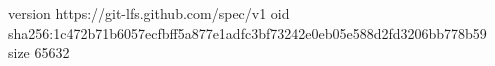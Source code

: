 version https://git-lfs.github.com/spec/v1
oid sha256:1c472b71b6057ecfbff5a877e1adfc3bf73242e0eb05e588d2fd3206bb778b59
size 65632
